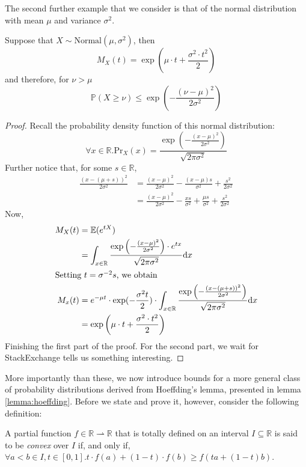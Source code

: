	The second further example that we consider is that of the normal distribution with mean
	$\mu$ and variance $\sigma^2$.
	\begin{claim}
		Suppose that $X \sim  \mathrm{Normal}(\mu, \sigma^2)$, then 
		$$	
			M_X(t) = \exp\left(\mu \cdot t + \frac{\sigma^2 \cdot t^2}{2}\right)
		$$
		and therefore, for $\nu > \mu$
		$$
			\mathbb{P}(X \geq \nu) \leq \exp\left(-\frac{(\nu-\mu)^2}{2\sigma^2}\right)
		$$
	\end{claim}
	\begin{proof}
		Recall the probability density function of this normal distribution:
		$$
			\forall x \in \mathbb{R} . 
			\mathrm{Pr}_X(x) = 
			\frac{\exp\left(-\frac{(x-\mu)^2}{2\sigma^2}\right)}{\sqrt{2\pi\sigma^2}}
		$$
		Further notice that, for some $s \in \mathbb{R}$,
		\begin{align*}
			\frac{(x - (\mu+s))^2}{2\sigma^2} &= \frac{(x-\mu)^2}{2\sigma^2} - 
			\frac{(x-\mu)s}{\sigma^2} + \frac{s^2}{2\sigma^2} \\
			&= \frac{(x-\mu)^2}{2\sigma^2} - \frac{xs}{\sigma^2}+\frac{\mu s}{\sigma^2}
			+ \frac{s^2}{2\sigma^2}
		\end{align*}
		Now,
		\begin{align*}
			M_X(t) &= \mathbb{E}(e^{tX}) \\
			&= \int_{x \in \mathbb{R}} 
			\frac{\exp\left(-\frac{(x-\mu)^2}{2\sigma^2}\right) \cdot e^{tx}
			}{\sqrt{2\pi\sigma^2}} \mathrm{d}x \\
			\intertext{Setting $t = \sigma^{-2} s$, we obtain}
			M_x(t) &= e^{-\mu t} \cdot \exp({-\frac{\sigma^2 t}{2}}) \cdot
			\int_{x \in \mathbb{R}}
		\frac{\exp\left(-\frac{(x-(\mu+s))^2}{2\sigma^2}\right)}{\sqrt{2\pi\sigma^2}}
			\mathrm{d}x
			\\
			&= \exp\left(\mu \cdot t + \frac{\sigma^2 \cdot t^2}{2}\right)
		\end{align*}
		Finishing the first part of the proof. For the second part, we wait for 
		StackExchange tells us something interesting.
	\end{proof}
	
	More importantly than these, we now introduce bounds for a more general class of 
	probability distributions derived from Hoeffding's lemma, presented in lemma 
	\ref{lemma:hoeffding}. Before we state and prove it, however, consider the following 
	definition:
	\begin{definition}
		A partial function $f \in \mathbb{R} \rightharpoonup \mathbb{R}$ that is totally
		defined on an interval $I\subseteq\mathbb{R}$ is said to be \emph{convex} over $I$
		if, and only if, $\forall a<b\in I,t\in[0,1].t\cdot f(a)+(1-t)\cdot f(b) \geq
		f(ta+(1-t)b)$.
	\end{definition}
	\begin{comment}
		The usual explanation for this is that the straight line connecting $f(a)$ and 
		$f(b)$ is above the graph of $f$ on $[a,b]$.
	\end{comment}

